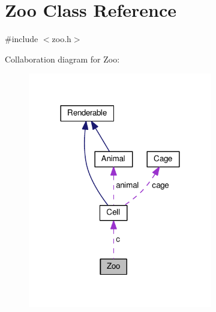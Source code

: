 \hypertarget{classZoo}{}\section{Zoo Class Reference}
\label{classZoo}


{\ttfamily \#include $<$zoo.\+h$>$}



Collaboration diagram for Zoo\+:
\nopagebreak
\begin{figure}[H]
\begin{center}
\leavevmode
\includegraphics[width=228pt]{classZoo__coll__graph}
\end{center}
\end{figure}
